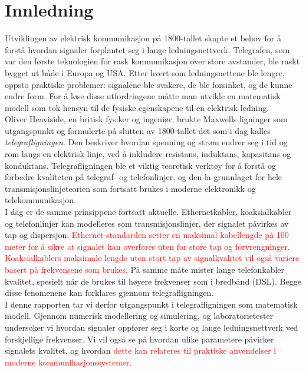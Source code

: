 \section{Innledning}

Utviklingen av elektrisk kommunikasjon på 1800-tallet skapte et behov for å forstå hvordan 
signaler forplantet seg i lange ledningsnettverk. Telegrafen, som var den første teknologien 
for rask kommunikasjon over store avstander, ble raskt bygget ut både i Europa og USA. Etter hvert 
som ledningsnettene ble lengre, oppsto praktiske problemer: signalene ble svakere, de ble 
forsinket, og de kunne endre form. For å løse disse utfordringene måtte man utvikle en matematisk 
modell som tok hensyn til de fysiske egenskapene til en elektrisk ledning.\\[1em] 
Oliver Heaviside, en britisk fysiker og ingeniør, brukte Maxwells ligninger som utgangspunkt og 
formulerte på slutten av 1800-tallet det som i dag kalles \textit{telegrafligningen}. Den beskriver 
hvordan spenning og strøm endrer seg i tid og rom langs en elektrisk linje, ved å inkludere 
resistans, induktans, kapasitans og konduktans. Telegrafligningen ble et viktig teoretisk verktøy 
for å forstå og forbedre kvaliteten på telegraf- og telefonlinjer, og den la grunnlaget for hele 
transmisjonslinjeteorien som fortsatt brukes i moderne elektronikk og telekommunikasjon.\\[1em]
I dag er de samme prinsippene fortsatt aktuelle. Ethernetkabler, koaksialkabler og telefonlinjer kan modelleres som transmisjonslinjer, der signalet påvirkes av tap og dispersjon. \textcolor{red}{Ethernet-standarden setter en maksimal kabellengde på 100 meter for å sikre at signalet kan overføres uten for store tap og 
forvrengninger. Koaksialkablers maksimale lengde uten stort tap av signalkvalitet vil også variere basert på frekvensene som brukes.} På samme måte mister lange telefonkabler kvalitet, spesielt når de brukes til høyere 
frekvenser som i bredbånd (DSL). Begge disse fenomenene kan forklares gjennom telegrafligningen. \\[1em]
I denne rapporten tar vi derfor utgangspunkt i telegrafligningen som matematisk modell. Gjennom numerisk
modellering og simulering, og laboratorietester undersøker vi hvordan signaler oppfører seg i korte og 
lange ledningsnettverk ved forskjellige frekvenser. Vi vil også se på hvordan ulike parametere påvirker 
signalets kvalitet, og hvordan \textcolor{red}{dette kan relateres til praktiske anvendelser i moderne kommunikasjonssystemer.}